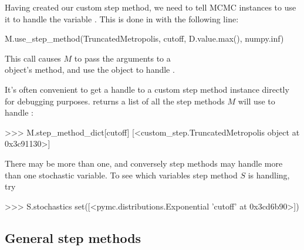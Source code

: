 \documentclass[]{jss}
\begin{document}
\medskip
Having created our custom step method, we need to tell MCMC instances to use it to handle the variable . This is done in  with the following line:
\begin{CodeInput}
M.use_step_method(TruncatedMetropolis, cutoff, D.value.max(), numpy.inf)
\end{CodeInput}
This call causes $M$ to pass the arguments  to a \\ object's  method, and use the object to handle .

\medskip
It's often convenient to get a handle to a custom step method instance directly for debugging purposes.  returns a list of all the step methods $M$ will use to handle :
\begin{CodeInput}
>>> M.step_method_dict[cutoff]
[<custom_step.TruncatedMetropolis object at 0x3c91130>]
\end{CodeInput}
There may be more than one, and conversely step methods may handle more than one stochastic variable. To see which variables step method $S$ is handling, try
\begin{CodeInput}
>>> S.stochastics
set([<pymc.distributions.Exponential 'cutoff' at 0x3cd6b90>])
\end{CodeInput}


\subsection{General step methods} \label{user-gen}
\end{document}
